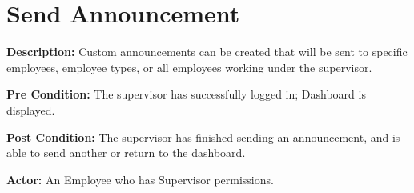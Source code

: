 \documentclass[letterpaper,12pt]{report}
\begin{document}
\section{Send Announcement}
\begin{description}
 \item \textbf{Description:} \newline Custom announcements can be created that will be sent to specific employees, employee types, or all employees working under the supervisor.
 \item \textbf{Pre Condition:} \newline The supervisor has successfully logged in; Dashboard is displayed.
 \item \textbf{Post Condition:} \newline The supervisor has finished sending an announcement, and is able to send another or return to the dashboard.
 \item \textbf{Actor:} \newline An Employee who has Supervisor permissions.
\end{description}
\end{document}
